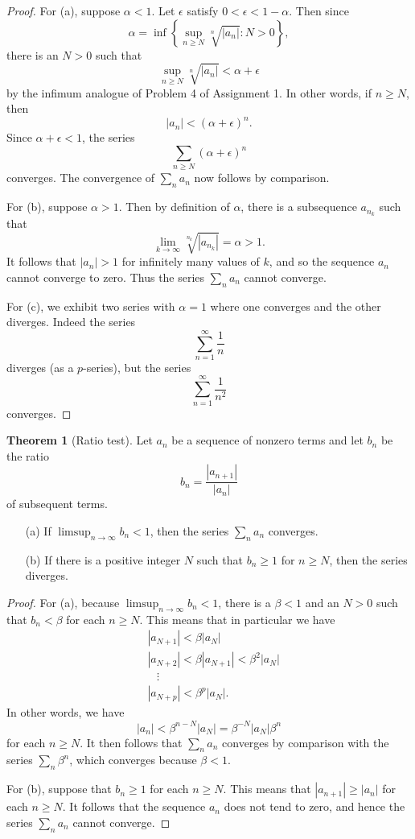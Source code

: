 \documentclass[12pt]{article}
\theoremstyle{definition}
\theoremstyle{theorem}
\newtheorem{theorem}[definition]{Theorem}
\begin{document}
\begin{proof}
For (a), suppose $\alpha < 1$. Let $\epsilon$ satisfy $0 < \epsilon < 1 - \alpha$. Then since 
\[
\alpha = \inf \left\{\sup_{n \geqslant N} \sqrt[n]{|a_n|} : N > 0\right\},
\]
there is an $N > 0$ such that 
\[
\sup_{n \geqslant N}\sqrt[n]{|a_n|} < \alpha + \epsilon
\]
by the infimum analogue of Problem 4 of Assignment 1. In other words, if $n \geqslant N$, then 
\[
|a_n| < (\alpha + \epsilon)^n.
\]
Since $\alpha + \epsilon < 1$, the series 
\[
\sum_{n \geqslant N} (\alpha + \epsilon)^n
\]
converges. The convergence of $\sum_n a_n$ now follows by comparison. 

For (b), suppose $\alpha > 1$. Then by definition of $\alpha$, there is a subsequence $a_{n_k}$ such that 
\[
\lim_{k \to \infty}\sqrt[n_k]{|a_{n_k}|} = \alpha > 1.
\]
It follows that $|a_n| > 1$ for infinitely many values of $k$, and so the sequence $a_n$ cannot converge to zero. Thus the series $\sum_n a_n$ cannot converge. 

For (c), we exhibit two series with $\alpha = 1$ where one converges and the other diverges. Indeed the series 
\[
\sum_{n=1}^\infty \frac{1}{n}
\]
diverges (as a $p$-series), but the series 
\[
\sum_{n=1}^\infty \frac{1}{n^2}
\]
converges. 
\end{proof}

\begin{theorem}[Ratio test]
Let $a_n$ be a sequence of nonzero terms and let $b_n$ be the ratio
\[
b_n = \frac{|a_{n+1}|}{|a_n|}
\]
of subsequent terms. 
\begin{enumerate}
\item[(a)] If $\limsup_{n \to \infty}b_n < 1$, then the series $\sum_n a_n$ converges. 
\item[(b)] If there is a positive integer $N$ such that $b_n \geqslant 1$ for $n \geqslant N$, then the series diverges. 
\end{enumerate}
\end{theorem}

\begin{proof}
For (a), because $\limsup_{n \to \infty}b_n < 1$, there is a $\beta < 1$ and an $N > 0$ such that $b_n < \beta$ for each $n \geqslant N$. This means that in particular we have 
\begin{align*}
&|a_{N+1}| < \beta |a_{N}| \\
&|a_{N+2}| < \beta |a_{N+1}| < \beta^2 |a_{N}| \\
&\;\;\;\vdots \\
&|a_{N+p}| < \beta^p |a_{N}|.
\end{align*}
In other words, we have 
\[
|a_n| < \beta^{n-N}|a_N| = \beta^{-N}|a_N| \beta^n
\]
for each $n \geqslant N$. It then follows that $\sum_n a_n$ converges by comparison with the series $\sum_n \beta^n$, which converges because $\beta < 1$.

For (b), suppose that $b_n \geqslant 1$ for each $n \geqslant N$. This means that $|a_{n+1}| \geqslant |a_n|$ for each $n \geqslant N$. It follows that the sequence $a_n$ does not tend to zero, and hence the series $\sum_n a_n$ cannot converge. 
\end{proof}
\end{document}
